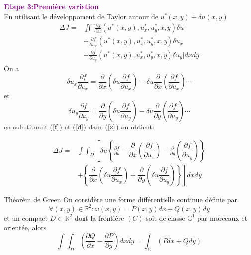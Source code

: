 \documentclass[12pt]{beamer}
\begin{document}
\begin{frame}
\textcolor{purple}{
	\textbf{\large{ Etape 3:Premi\`{e}re variation}}}\\
En utilisant le d\'{e}veloppoment de Taylor autour de $u^{*}(x,y)+\delta u(x,y)$
\begin{align}
\Delta J=&\iint[\frac{\partial{f}}{\partial{u}}(u^{*}(x,y),u^{*}_{x},u^{*}_{y},x,y)\delta u\nonumber\\&+\frac{\partial{f}}{\partial{u_{x}}}(u^{*}(x,y),u^{*}_{x},u^{*}_{y},x,y)\delta u_{x}\nonumber\\&
+\frac{\partial{f}}{\partial{u_{y}}}(u^{*}(x,y),u^{*}_{x},u^{*}_{y},x,y)\delta u_{y}]dxdy \label{x}
\end{align}
On a \begin{equation}\delta u_{x}\dfrac{\partial{f}}{\partial{u_{x}}}=\dfrac{\partial}{\partial{x}}(\delta u\dfrac{\partial{f}}{\partial{u_{x}}})-\delta u\dfrac{\partial}{\partial{x}}(\dfrac{\partial{f}}{\partial{u_{x}}})\cdots 
\label{f}\end{equation}
et \begin{equation}\delta u_{y}\dfrac{\partial{f}}{\partial{u_{y}}}=\dfrac{\partial}{\partial{y}}(\delta u\dfrac{\partial{f}}{\partial{u_{y}}})-\delta u\dfrac{\partial}{\partial{y}}(\dfrac{\partial{f}}{\partial{u_{y}}})\cdots 
\label{d}\end{equation}
en substituant ($\ref{f}$) et ($\ref{d}$) dans ($\ref{x}$) on obtient:
\end{frame}
\begin{frame}
\begin{align}
\Delta J=&\int\int_{D}\left[  \delta u\left\lbrace \frac{\partial{f}}{\partial{u}}-\dfrac{\partial}{\partial{x}}(\dfrac{\partial{f}}{\partial{u}_{x}})-\frac{\partial}{\partial{y}}(\dfrac{\partial{f}}{\partial{u}_{y}})\right\rbrace \right. \nonumber \\&\left. +\left\lbrace \dfrac{\partial}{\partial{x}}(\delta u\dfrac{\partial{f}}{\partial{u}_{x}})+ \dfrac{\partial}{\partial{y}}(\delta u\dfrac{\partial{f}}{\partial{u}_{y}})\right\rbrace \right]dxdy 
\label{m}\end{align}
\begin{alertblock}{Th\'{e}or\`{e}m de Green}
	On consid\`{e}re une forme diff\'{e}rentielle continue d\'{e}finie par 
	\begin{equation}\forall (x,y)\in \mathbb{R}^{2}: \omega(x,y)=P(x,y)dx+Q(x,y)dy\end{equation} et un compact $D\subset \mathbb{R}^{2}$ dont la fronti\`{e}re $(C)$ soit de classe $\mathbb{C}^{1}$ par morceaux et orient\'{e}e, alors 
	\begin{equation}\int\int_{D}\left( \dfrac{\partial{Q}}{\partial{x}}-\dfrac{\partial{P}}{\partial{y}}\right) dxdy=\int_{C}(Pdx+Qdy)\label{c}\end{equation}
\end{alertblock}
\end{frame}
\end{document}
